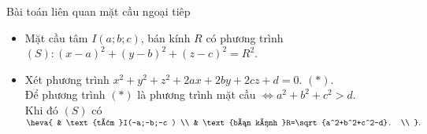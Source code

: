 \begin{dang}{Bài toán liên quan mặt cầu ngoại tiêp}
	\begin{itemize}
		\item Mặt cầu tâm $I(a;b;c )$, bán kính $R$ có phương trình
		$(S )\colon (x-a )^2+(y-b )^2+(z-c )^2=R^2$.
		\item Xét phương trình $x^2+y^2+z^2+2ax+2by+2cz+d=0$. $(* )$.\\
		Để phương trình $(* )$ là phương trình mặt cầu $\Leftrightarrow a^2+b^2+c^2>d$.\\ Khi đó $(S )$ có
		$\heva{
			& \text{tâm }I(-a;-b;-c ) \\
			& \text{bán kính }R=\sqrt{a^2+b^2+c^2-d}. \\
		}.$ 
	\end{itemize}
\end{dang}
